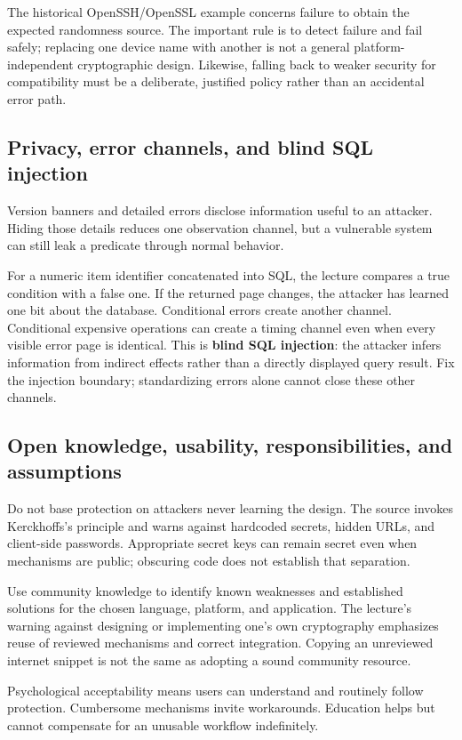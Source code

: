 \documentclass[11pt,a4paper]{article}
\numberwithin{figure}{section}
\begin{document}
The historical OpenSSH/OpenSSL example concerns failure to obtain the expected randomness source. The important rule is to detect failure and fail safely; replacing one device name with another is not a general platform-independent cryptographic design. Likewise, falling back to weaker security for compatibility must be a deliberate, justified policy rather than an accidental error path.

\subsection{Privacy, error channels, and blind SQL injection}
Version banners and detailed errors disclose information useful to an attacker. Hiding those details reduces one observation channel, but a vulnerable system can still leak a predicate through normal behavior.

For a numeric item identifier concatenated into SQL, the lecture compares a true condition with a false one. If the returned page changes, the attacker has learned one bit about the database. Conditional errors create another channel. Conditional expensive operations can create a timing channel even when every visible error page is identical. This is \textbf{blind SQL injection}: the attacker infers information from indirect effects rather than a directly displayed query result. Fix the injection boundary; standardizing errors alone cannot close these other channels.

\subsection{Open knowledge, usability, responsibilities, and assumptions}
Do not base protection on attackers never learning the design. The source invokes Kerckhoffs's principle and warns against hardcoded secrets, hidden URLs, and client-side passwords. Appropriate secret keys can remain secret even when mechanisms are public; obscuring code does not establish that separation.

Use community knowledge to identify known weaknesses and established solutions for the chosen language, platform, and application. The lecture's warning against designing or implementing one's own cryptography emphasizes reuse of reviewed mechanisms and correct integration. Copying an unreviewed internet snippet is not the same as adopting a sound community resource.

Psychological acceptability means users can understand and routinely follow protection. Cumbersome mechanisms invite workarounds. Education helps but cannot compensate for an unusable workflow indefinitely.
\end{document}
